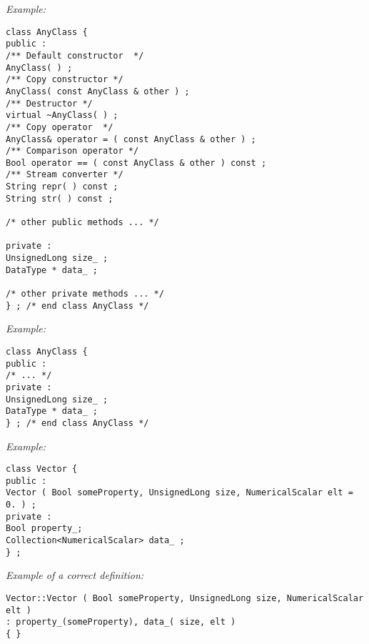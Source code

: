 \emph{Example:}
\lstset{language=C++, basicstyle=\normalsize}
\begin{lstlisting}[frame=TBRL]
class AnyClass {
public :
/** Default constructor  */
AnyClass( ) ;
/** Copy constructor */
AnyClass( const AnyClass & other ) ;
/** Destructor */
virtual ~AnyClass( ) ;
/** Copy operator  */
AnyClass& operator = ( const AnyClass & other ) ;
/** Comparison operator */
Bool operator == ( const AnyClass & other ) const ;
/** Stream converter */
String repr( ) const ;
String str( ) const ;

/* other public methods ... */

private :
UnsignedLong size_ ;
DataType * data_ ;

/* other private methods ... */
} ; /* end class AnyClass */
\end{lstlisting}



\emph{Example:}
\lstset{language=C++, basicstyle=\normalsize}
\begin{lstlisting}[frame=TBRL]
class AnyClass {
public :
/* ... */
private :
UnsignedLong size_ ;
DataType * data_ ;
} ; /* end class AnyClass */
\end{lstlisting}


\emph{Example:}
\lstset{language=C++, basicstyle=\normalsize}
\begin{lstlisting}[frame=TBRL]
class Vector {
public :
Vector ( Bool someProperty, UnsignedLong size, NumericalScalar elt = 0. ) ;
private :
Bool property_;
Collection<NumericalScalar> data_ ;
} ;
\end{lstlisting}

\emph{Example of a correct definition:}
\begin{lstlisting}[frame=TBRL]
Vector::Vector ( Bool someProperty, UnsignedLong size, NumericalScalar elt )
: property_(someProperty), data_( size, elt )
{ }
\end{lstlisting}

